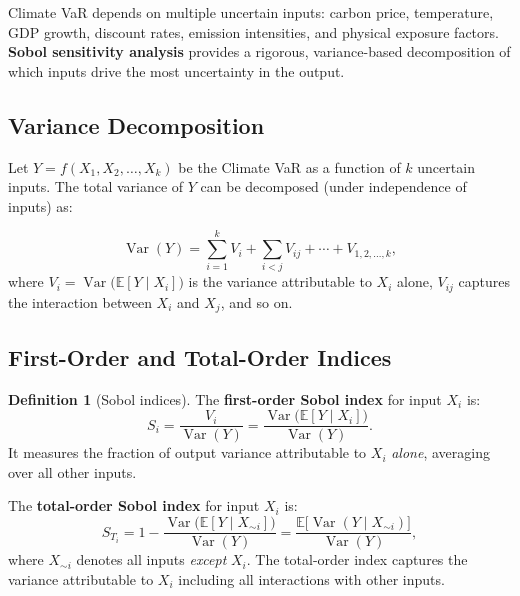 \documentclass[11pt, a4paper]{article}
\theoremstyle{definition}
\newtheorem{definition}{Definition}[section]
\theoremstyle{plain}
\theoremstyle{remark}
\newcommand{\EV}{\mathbb{E}}
\begin{document}
Climate VaR depends on multiple uncertain inputs: carbon price, temperature,
GDP growth, discount rates, emission intensities, and physical exposure factors.
\textbf{Sobol sensitivity analysis} provides a rigorous, variance-based
decomposition of which inputs drive the most uncertainty in the output.

\subsection{Variance Decomposition}

Let $Y = f(X_1, X_2, \ldots, X_k)$ be the Climate VaR as a function of $k$
uncertain inputs.
The total variance of $Y$ can be decomposed (under independence of inputs) as:

\begin{equation}\label{eq:anova-decomposition}
    \operatorname{Var}(Y) = \sum_{i=1}^{k} V_i
    + \sum_{i < j} V_{ij} + \cdots + V_{1,2,\ldots,k},
\end{equation}
where $V_i = \operatorname{Var}\bigl(\EV[Y \mid X_i]\bigr)$ is the variance
attributable to $X_i$ alone, $V_{ij}$ captures the interaction between $X_i$ and
$X_j$, and so on.

\subsection{First-Order and Total-Order Indices}

\begin{definition}[Sobol indices]\label{def:sobol}
The \textbf{first-order Sobol index} for input $X_i$ is:
\begin{equation}\label{eq:sobol-first}
    S_i = \frac{V_i}{\operatorname{Var}(Y)}
    = \frac{\operatorname{Var}\bigl(\EV[Y \mid X_i]\bigr)}{\operatorname{Var}(Y)}.
\end{equation}
It measures the fraction of output variance attributable to $X_i$ \emph{alone},
averaging over all other inputs.

The \textbf{total-order Sobol index} for input $X_i$ is:
\begin{equation}\label{eq:sobol-total}
    S_{T_i} = 1 - \frac{\operatorname{Var}\bigl(\EV[Y \mid X_{\sim i}]\bigr)}
    {\operatorname{Var}(Y)}
    = \frac{\EV\bigl[\operatorname{Var}(Y \mid X_{\sim i})\bigr]}
    {\operatorname{Var}(Y)},
\end{equation}
where $X_{\sim i}$ denotes all inputs \emph{except} $X_i$.
The total-order index captures the variance attributable to $X_i$ including all
interactions with other inputs.
\end{definition}
\end{document}
